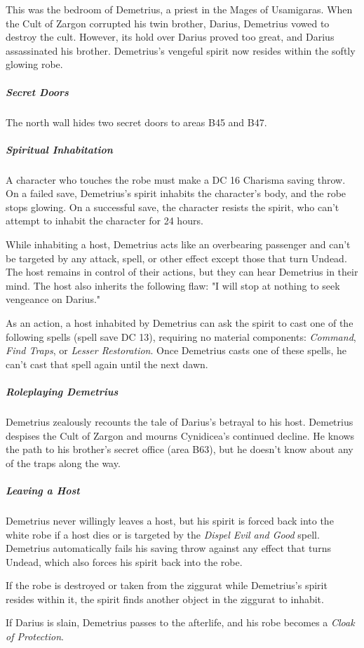 \documentclass[10pt,a4paper,twoside,bg=print,twocolumn,openany,nodeprecatedcode]{dndbook}
\begin{document}
This was the bedroom of Demetrius, a priest in the Mages of Usamigaras. When the Cult of Zargon corrupted his twin brother, Darius, Demetrius vowed to destroy the cult. However, its hold over Darius proved too great, and Darius assassinated his brother. Demetrius's vengeful spirit now resides within the softly glowing robe.

\subparagraph{Secret Doors}
The north wall hides two secret doors to areas B45 and B47.

\subparagraph{Spiritual Inhabitation}
A character who touches the robe must make a DC 16 Charisma saving throw. On a failed save, Demetrius's spirit inhabits the character's body, and the robe stops glowing. On a successful save, the character resists the spirit, who can't attempt to inhabit the character for 24 hours.

While inhabiting a host, Demetrius acts like an overbearing passenger and can't be targeted by any attack, spell, or other effect except those that turn Undead. The host remains in control of their actions, but they can hear Demetrius in their mind. The host also inherits the following flaw: "I will stop at nothing to seek vengeance on Darius."

As an action, a host inhabited by Demetrius can ask the spirit to cast one of the following spells (spell save DC 13), requiring no material components: \textit{Command}, \textit{Find Traps}, or \textit{Lesser Restoration}. Once Demetrius casts one of these spells, he can't cast that spell again until the next dawn.

\subparagraph{Roleplaying Demetrius}
Demetrius zealously recounts the tale of Darius's betrayal to his host. Demetrius despises the Cult of Zargon and mourns Cynidicea's continued decline. He knows the path to his brother's secret office (area B63), but he doesn't know about any of the traps along the way.

\subparagraph{Leaving a Host}
Demetrius never willingly leaves a host, but his spirit is forced back into the white robe if a host dies or is targeted by the \textit{Dispel Evil and Good} spell. Demetrius automatically fails his saving throw against any effect that turns Undead, which also forces his spirit back into the robe.

If the robe is destroyed or taken from the ziggurat while Demetrius's spirit resides within it, the spirit finds another object in the ziggurat to inhabit.

If Darius is slain, Demetrius passes to the afterlife, and his robe becomes a \textit{Cloak of Protection}.
\end{document}
